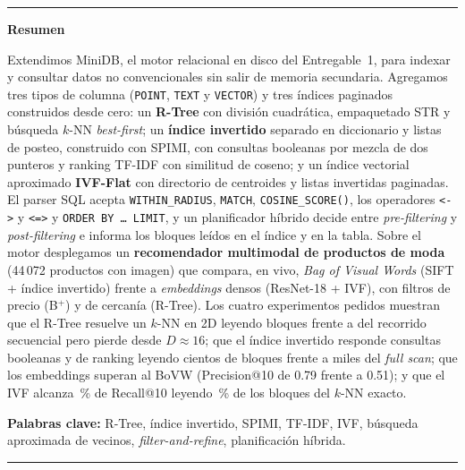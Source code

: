\documentclass[11pt,a4paper]{article}
\newcommand{\code}[1]{\texttt{#1}}
\begin{document}
\vspace{1.5em}
\noindent\rule{\textwidth}{0.4pt}\par
\vspace{0.4em}
\noindent\textbf{Resumen}\par
\vspace{0.3em}
\noindent Extendimos MiniDB, el motor relacional en disco del Entregable~1, para indexar y consultar
datos no convencionales sin salir de memoria secundaria. Agregamos tres tipos de columna
(\code{POINT}, \code{TEXT} y \code{VECTOR}) y tres índices paginados construidos desde cero: un
\textbf{R-Tree} con división cuadrática, empaquetado STR y búsqueda $k$-NN \emph{best-first}; un
\textbf{índice invertido} separado en diccionario y listas de posteo, construido con SPIMI, con
consultas booleanas por mezcla de dos punteros y ranking TF-IDF con similitud de coseno; y un índice
vectorial aproximado \textbf{IVF-Flat} con directorio de centroides y listas invertidas paginadas. El
parser SQL acepta \code{WITHIN\_RADIUS}, \code{MATCH}, \code{COSINE\_SCORE()}, los operadores
\code{<->} y \code{<=>} y \code{ORDER BY \dots\ LIMIT}, y un planificador híbrido decide entre
\emph{pre-filtering} y \emph{post-filtering} e informa los bloques leídos en el índice y en la tabla.
Sobre el motor desplegamos un \textbf{recomendador multimodal de productos de moda} (44\,072
productos con imagen) que compara, en vivo, \emph{Bag of Visual Words} (SIFT + índice invertido)
frente a \emph{embeddings} densos (ResNet-18 + IVF), con filtros de precio (B$^+$) y de cercanía
(R-Tree). Los cuatro experimentos pedidos muestran que el R-Tree resuelve un $k$-NN en 2D leyendo
 bloques frente a  del recorrido
secuencial pero pierde desde $D\approx16$; que el índice invertido responde consultas booleanas y de
ranking leyendo cientos de bloques frente a miles del \emph{full scan}; que los embeddings superan al
BoVW (Precision@10 de 0.79 frente a 0.51); y que el IVF alcanza \,\% de Recall@10 leyendo
\,\% de los bloques del $k$-NN exacto.
\par
\vspace{0.4em}
\noindent\textbf{Palabras clave:} R-Tree, índice invertido, SPIMI, TF-IDF, IVF, búsqueda aproximada de
vecinos, \emph{filter-and-refine}, planificación híbrida.
\par\vspace{0.2em}
\noindent\rule{\textwidth}{0.4pt}

\vspace{0.6em}
\tableofcontents
\newpage
\end{document}
